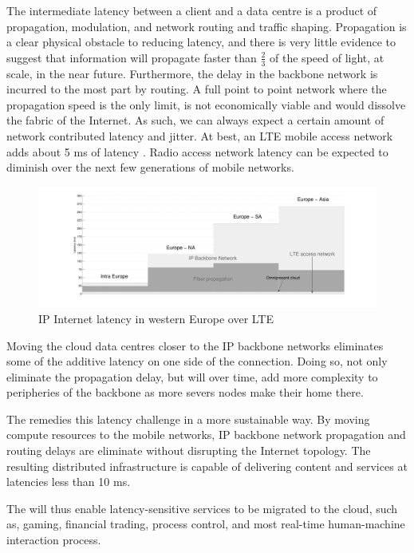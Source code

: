 The intermediate latency between a client and a data centre is a product of propagation, modulation, and network routing and traffic shaping. Propagation is a clear physical obstacle to reducing latency, and there is very little evidence to suggest that information will propagate faster than $\frac{2}{3}$ of the speed of light, at scale, in the near future. Furthermore, the delay in the backbone network is incurred to the most part by routing. A full point to point network where the propagation speed is the only limit, is not economically viable and would dissolve the fabric of the Internet. As such, we can always expect a certain amount of network contributed latency and jitter. At best, an LTE mobile access network adds about 5 ms of latency \cite{blajic2006latency}. Radio access network latency can be expected to diminish over the next few generations of mobile networks. 

\begin{figure}[tb]
	\centering
	\includegraphics[height=0.12\paperheight]{omni_motivation.pdf} 
	\caption{IP Internet latency in western Europe \cite{BT_IP} over LTE \cite{blajic2006latency}}
	\label{fig:omni_motivation}
\end{figure}

Moving the cloud data centres closer to the IP backbone networks eliminates some of the additive latency on one side of the connection. Doing so, not only eliminate the propagation delay, but will over time, add more complexity to peripheries of the backbone as more severs nodes make their home there. 

The \xcloud remedies this latency challenge in a more sustainable way. By moving compute resources to the mobile networks, IP backbone network propagation and routing delays are eliminate without disrupting the Internet topology. The resulting distributed infrastructure is capable of delivering content and services at latencies less than 10 ms. 

The \xcloud will thus enable latency-sensitive services to be migrated to the cloud, such as, gaming, financial trading, process control, and most real-time human-machine interaction process.